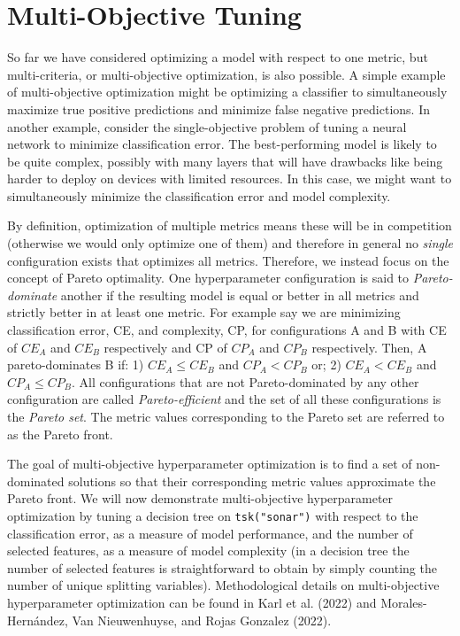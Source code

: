 \hypertarget{sec-multi-metrics-tuning}{%
\section{Multi-Objective Tuning}\label{sec-multi-metrics-tuning}}

So far we have considered optimizing a model with respect to one metric,
but multi-criteria, or
multi-objective
optimization, is also possible. A simple example of multi-objective
optimization might be optimizing a classifier to simultaneously maximize
true positive predictions and minimize false negative predictions. In
another example, consider the single-objective problem of tuning a
neural network to minimize classification error.
The best-performing model is likely to be quite complex, possibly with
many layers that will have drawbacks like being harder to deploy on
devices with limited resources. In this case, we might want to
simultaneously minimize the classification error and model complexity.

By definition, optimization of multiple metrics means these will be in
competition (otherwise we would only optimize one of them) and therefore
in general no \emph{single} configuration exists that optimizes all
metrics. Therefore, we instead focus on the concept of Pareto
optimality. One hyperparameter configuration is
said to \emph{Pareto-dominate} another if the resulting model is equal
or better in all metrics and strictly better in at least one metric. For
example say we are minimizing classification error, CE, and complexity,
CP, for configurations A and B with CE of \(CE_A\) and \(CE_B\)
respectively and CP of \(CP_A\) and \(CP_B\) respectively. Then, A
pareto-dominates B if: 1) \(CE_A \leq CE_B\) and \(CP_A < CP_B\) or; 2)
\(CE_A < CE_B\) and \(CP_A \leq CP_B\). All configurations that are not
Pareto-dominated by any other configuration are called
\emph{Pareto-efficient} and the set of all these configurations is the
\emph{Pareto set}. The metric values corresponding to the Pareto set are
referred to as the Pareto
front.

The goal of multi-objective hyperparameter optimization is to find a set
of non-dominated solutions so that their corresponding metric values
approximate the Pareto front. We will now demonstrate multi-objective
hyperparameter optimization by tuning a decision tree on
\texttt{tsk("sonar")} with respect to the classification error, as a
measure of model performance, and the number of selected features, as a
measure of model complexity (in a decision tree the number of selected
features is straightforward to obtain by simply counting the number of
unique splitting variables). Methodological details on multi-objective
hyperparameter optimization can be found in Karl et al. (2022) and
Morales-Hernández, Van Nieuwenhuyse, and Rojas Gonzalez (2022).

